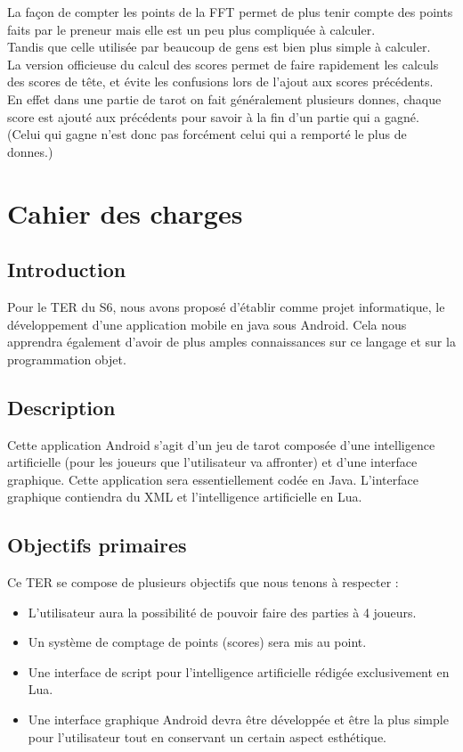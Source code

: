 \documentclass[a4paper]{report}
\begin{document}
				La façon de compter les points de la FFT permet de plus tenir compte des points faits par le preneur mais elle est un peu plus compliquée à calculer.\\
				Tandis que celle utilisée par beaucoup de gens est bien plus simple à calculer.\\
				La version officieuse du calcul des scores permet de faire rapidement les calculs des scores de tête, et évite les confusions lors de l’ajout aux scores précédents.\\
				En effet dans une partie de tarot on fait généralement plusieurs donnes, chaque score est ajouté aux précédents pour savoir à la fin d’un partie qui a gagné. (Celui 					qui gagne n’est donc pas forcément celui qui a remporté le plus de donnes.)\\













\chapter{Cahier des charges}
	\section{Introduction}

		Pour le TER du S6, nous avons proposé d'établir comme projet informatique, le développement d'une application mobile en java sous Android. Cela nous apprendra également d'avoir de plus 			amples 	connaissances sur ce langage et sur la programmation objet.
	\section{Description}

		Cette application Android s'agit d'un jeu de tarot composée d'une intelligence artificielle (pour les joueurs que l'utilisateur va affronter) et d'une interface graphique. Cette 			application sera essentiellement codée en Java. L'interface graphique contiendra du XML et l'intelligence artificielle en Lua.
	\section{Objectifs primaires}

		Ce TER se compose de plusieurs objectifs que nous tenons à respecter :
		\begin{itemize}
			\item L'utilisateur aura la possibilité de pouvoir faire des parties à 4 joueurs.
			\item Un système de comptage de points (scores) sera mis au point.
			\item Une interface de script pour l'intelligence artificielle rédigée exclusivement en Lua.
			\item Une interface graphique Android devra être développée et être la plus simple pour l'utilisateur tout en conservant un certain aspect esthétique.
		\end{itemize}
\end{document}
